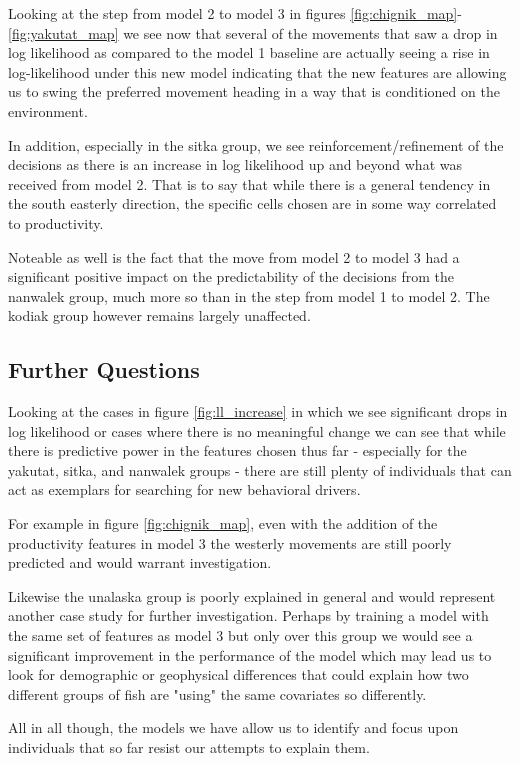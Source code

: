 \documentclass[11pt]{article}
\begin{document}
Looking at the step from model 2 to model 3 in figures \ref{fig:chignik_map}-\ref{fig:yakutat_map} we see now that several of the movements that saw a drop in log likelihood as compared to the model 1 baseline are actually seeing a rise in log-likelihood under this new model indicating that the new features are allowing us to swing the preferred movement heading in a way that is conditioned on the environment. 

In addition, especially in the sitka group, we see reinforcement/refinement of the decisions as there is an increase in log likelihood up and beyond what was received from model 2. That is to say that while there is a general tendency in the south easterly direction, the specific cells chosen are in some way correlated to productivity. 

Noteable as well is the fact that the move from model 2 to model 3 had a significant positive impact on the predictability of the decisions from the nanwalek group, much more so than in the step from model 1 to model 2. The kodiak group however remains largely unaffected. 

\subsection*{Further Questions}

Looking at the cases in figure \ref{fig:ll_increase} in which we see significant drops in log likelihood or cases where there is no meaningful change we can see that while there is predictive power in the features chosen thus far - especially for the yakutat, sitka, and nanwalek groups - there are still plenty of individuals that can act as exemplars for searching for new behavioral drivers. 

For example in figure \ref{fig:chignik_map}, even with the addition of the productivity features in model 3 the westerly movements are still poorly predicted and would warrant investigation. 

Likewise the unalaska group is poorly explained in general and would represent another case study for further investigation. Perhaps by training a model with the same set of features as model 3 but only over this group we would see a significant improvement in the performance of the model which may lead us to look for demographic or geophysical differences that could explain how two different groups of fish are "using" the same covariates so differently. 

All in all though, the models we have allow us to identify and focus upon individuals that so far resist our attempts to explain them. 
\end{document}
